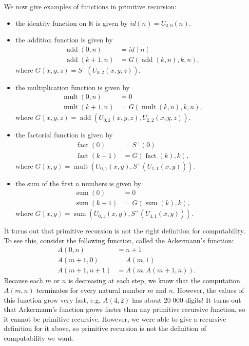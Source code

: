 \documentclass[a4paper, openany]{memoir}
\theoremstyle{definition}
\begin{document}
    We now give examples of functions in primitive recursion:
    \begin{itemize}
        \item the identity function on $\mathbb{N}$ is given by $id(n) = U_{0, 0}(n)$.
        
        \item the addition function is given by
        \begin{align*}
            \operatorname{add}(0, n) &= id(n) \\
            \operatorname{add}(k+1, n) &= G(\operatorname{add}(k, n), k, n),
        \end{align*}
        where $G(x, y, z) = S^+(U_{0, 2}(x, y, z))$.

        \item the multiplication function is given by
        \begin{align*}
            \operatorname{mult}(0, n) &= 0 \\
            \operatorname{mult}(k+1, n) &= G(\operatorname{mult}(k, n), k, n),
        \end{align*}
        where $G(x, y, z) = \operatorname{add}(U_{0, 2}(x, y, z), U_{2, 2}(x, y, z))$.

        \item the factorial function is given by
        \begin{align*}
            \operatorname{fact}(0) &= S^+(0) \\
            \operatorname{fact}(k+1) &= G(\operatorname{fact}(k), k),
        \end{align*}
        where $G(x, y) = \operatorname{mult}(U_{0, 1}(x, y), S^+(U_{1, 1}(x, y)))$.

        \item the sum of the first $n$ numbers is given by
        \begin{align*}
            \operatorname{sum}(0) &= 0 \\
            \operatorname{sum}(k+1) &= G(\operatorname{sum}(k), k),
        \end{align*}
        where $G(x, y) = \operatorname{sum}(U_{0, 1}(x, y), S^+(U_{1, 1}(x, y)))$.
    \end{itemize}

    It turns out that primitive recursion is not the right definition for computability. To see this, consider the following function, called the Ackermann's function:
    \begin{align*}
        A(0, n) &= n + 1 \\
        A(m + 1, 0) &= A(m, 1) \\
        A(m+1, n+1) &= A(m, A(m+1, n)).
    \end{align*}
    Because each $m$ or $n$ is decreasing at each step, we know that the computation $A(m, n)$ terminates for every natural number $m$ and $n$. However, the values of this function grow very fast, e.g. $A(4, 2)$ has about 20 000 digits! It turns out that Ackermann's function grows faster than any primitive recursive function, so it cannot be primitive recursive. However, we were able to give a recursive definition for it above, so primitive recursion is not the definition of computability we want.
\end{document}
